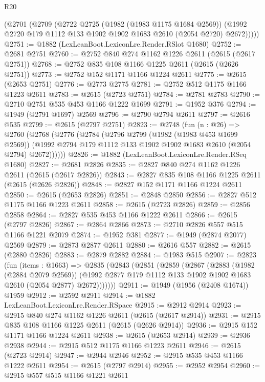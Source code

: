 \begin{lexlean}{R20}
\begin{coremodule}
{{{{{{{{{{{{{{{{{{{{{{{{{{{{{{{{{{{{{{{{{{{{{{{{{{{{{{{{{{{{{{{      (@2701
        (@2709
          (@2722
            @2725
            (@1982 (@1983 @1175 @1684 @2569))
            (@1992 @2720 @179 @1112 @133 @1902 @1902 @1683 @2610 (@2054 @2720) @2672)))))
@2751 := @1882 (LexLeanBoot.LexiconLre.Render.RSlot @1680)
@2752 := @2681 @2751
@2760 := @2752 @840 @274 @1162 @1226 @2611 (@2615 (@2617 @2751))
@2768 := @2752 @835 @108 @1166 @1225 @2611 (@2615 (@2626 @2751))
@2773 := @2752 @152 @1171 @1166 @1224 @2611
@2775 := @2615 (@2653 @2751)
@2776 := @2773 @2775
@2781 := @2752 @512 @1175 @1166 @1223 @2611
@2783 := @2615 (@2723 @2751)
@2784 := @2781 @2783
@2790 := @2710 @2751 @535 @453 @1166 @1222 @1699
@2791 := @1952 @376
@2794 := @1949 (@2791 @1697) @2569
@2796 := @2790 @2794 @2611
@2797 := @2616 @535
@2799 := @2615 (@2797 @2751)
@2823 := @2748
    (fun (n : @26) =>
    @2760
      (@2768
        (@2776
          (@2784
            (@2796
              @2799
              (@1982 (@1983 @453 @1699 @2569))
              (@1992 @2794 @179 @1112 @133 @1902 @1902 @1683 @2610 (@2054 @2794) @2672))))))
@2826 := @1882 (LexLeanBoot.LexiconLre.Render.RSeq @1680)
@2827 := @2681 @2826
@2835 := @2827 @840 @274 @1162 @1226 @2611 (@2615 (@2617 @2826))
@2843 := @2827 @835 @108 @1166 @1225 @2611 (@2615 (@2626 @2826))
@2848 := @2827 @152 @1171 @1166 @1224 @2611
@2850 := @2615 (@2653 @2826)
@2851 := @2848 @2850
@2856 := @2827 @512 @1175 @1166 @1223 @2611
@2858 := @2615 (@2723 @2826)
@2859 := @2856 @2858
@2864 := @2827 @535 @453 @1166 @1222 @2611
@2866 := @2615 (@2797 @2826)
@2867 := @2864 @2866
@2873 := @2710 @2826 @557 @515 @1166 @1221 @2079
@2874 := @1952 @381
@2877 := @1949 (@2874 @2077) @2569
@2879 := @2873 @2877 @2611
@2880 := @2616 @557
@2882 := @2615 (@2880 @2826)
@2883 := @2879 @2882
@2884 := @1983 @515
@2907 := @2823
    (fun (items : @1663) =>
    @2835
      (@2843
        (@2851
          (@2859
            (@2867
              (@2883
                (@1982 (@2884 @2079 @2569))
                (@1992 @2877 @179 @1112 @133 @1902 @1902 @1683 @2610 (@2054 @2877) @2672)))))))
@2911 := @1949 (@1956 (@2408 @1674)) @1959
@2912 := @2592 @2911
@2914 := @1882 LexLeanBoot.LexiconLre.Render.RSpace
@2915 := @2912 @2914
@2923 := @2915 @840 @274 @1162 @1226 @2611 (@2615 (@2617 @2914))
@2931 := @2915 @835 @108 @1166 @1225 @2611 (@2615 (@2626 @2914))
@2936 := @2915 @152 @1171 @1166 @1224 @2611
@2938 := @2615 (@2653 @2914)
@2939 := @2936 @2938
@2944 := @2915 @512 @1175 @1166 @1223 @2611
@2946 := @2615 (@2723 @2914)
@2947 := @2944 @2946
@2952 := @2915 @535 @453 @1166 @1222 @2611
@2954 := @2615 (@2797 @2914)
@2955 := @2952 @2954
@2960 := @2915 @557 @515 @1166 @1221 @2611
}}}}}}}}}}}}}}}}}}}}}}}}}}}}}}}}}}}}}}}}}}}}}}}}}}}}}}}}}}}}}}}
\end{coremodule}
\end{lexlean}
